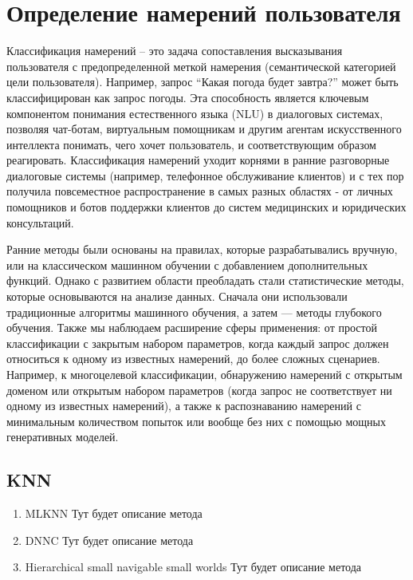 \documentclass[14pt,a4paper,oneside,openany]{book}
\begin{document}
\section{Определение намерений пользователя}
\label{sec:org02b3e55}
Классификация намерений –  это задача сопоставления высказывания пользователя с предопределенной меткой намерения (семантической категорией цели пользователя). Например, запрос “Какая погода будет завтра?” может быть классифицирован как запрос погоды. Эта способность является ключевым компонентом понимания естественного языка (NLU) в диалоговых системах, позволяя чат-ботам, виртуальным помощникам и другим агентам искусственного интеллекта понимать, чего хочет пользователь, и соответствующим образом реагировать. Классификация намерений уходит корнями в ранние разговорные диалоговые системы (например, телефонное обслуживание клиентов) и с тех пор получила повсеместное распространение в самых разных областях - от личных помощников и ботов поддержки клиентов до систем медицинских и юридических консультаций.

Ранние методы были основаны на правилах, которые разрабатывались вручную, или на классическом машинном обучении с добавлением дополнительных функций. Однако с развитием области преобладать стали статистические методы, которые основываются на анализе данных. Сначала они использовали традиционные алгоритмы машинного обучения, а затем — методы глубокого обучения. Также мы наблюдаем расширение сферы применения: от простой классификации с закрытым набором параметров, когда каждый запрос должен относиться к одному из известных намерений, до более сложных сценариев. Например, к многоцелевой классификации, обнаружению намерений с открытым доменом или открытым набором параметров (когда запрос не соответствует ни одному из известных намерений), а также к распознаванию намерений с минимальным количеством попыток или вообще без них с помощью мощных генеративных моделей.
\subsection{KNN}
\label{sec:orgb3a1a91}
\begin{enumerate}
\item MLKNN
\label{sec:orgcc851fd}
Тут будет описание метода \autocite{zhang_mlknn_2007}
\item DNNC
\label{sec:org55d4e21}
Тут будет описание метода \autocite{zhang_discriminative_2020}
\item Hierarchical small navigable small worlds
\label{sec:org543ff21}
Тут будет описание метода \autocite{malkov_efficient_2018}
\end{enumerate}
\end{document}
